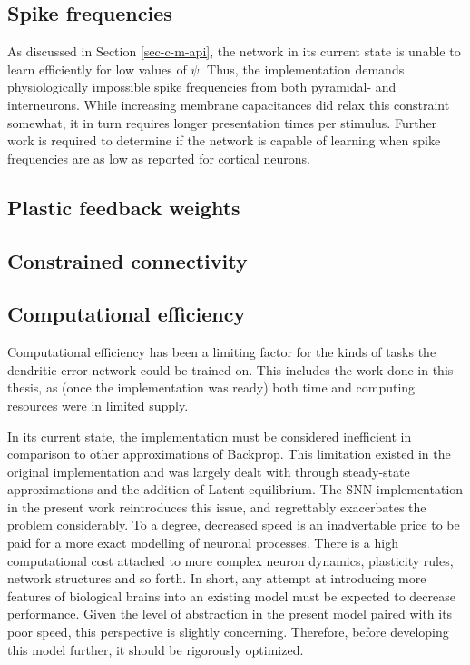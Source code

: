 \subsection*{Spike frequencies}

As discussed in Section \ref{sec-c-m-api}, the network in its current state is unable to learn efficiently for low
values of $\psi$. Thus, the implementation demands physiologically impossible spike frequencies from both pyramidal- and
interneurons. While increasing membrane capacitances did relax this constraint somewhat, it in turn requires longer
presentation times per stimulus. Further work is required to determine if the network is capable of learning when spike
frequencies are as low as reported for cortical neurons.

\subsection*{Plastic feedback weights}



\subsection*{Constrained connectivity}


\subsection{Computational efficiency}

Computational efficiency has been a limiting factor for the kinds of tasks the dendritic error network
could be trained on. This includes the work done in this thesis, as (once the implementation was ready) both time and
computing resources were in limited supply.

In its current state, the implementation must be considered inefficient in comparison to other approximations of
Backprop. This limitation existed in the original implementation and was largely dealt with through steady-state
approximations and the addition of Latent equilibrium. The SNN implementation in the present work reintroduces this
issue, and regrettably exacerbates the problem considerably. To a degree, decreased speed is an inadvertable price to be
paid for a more exact modelling of neuronal processes. There is a high computational cost attached to more complex
neuron dynamics, plasticity rules, network structures and so forth. In short, any attempt at introducing more features
of biological brains into an existing model must be expected to decrease performance. Given the level of
abstraction in the present model paired with its poor speed, this perspective is slightly concerning. Therefore, before
developing this model further, it should be rigorously optimized.

